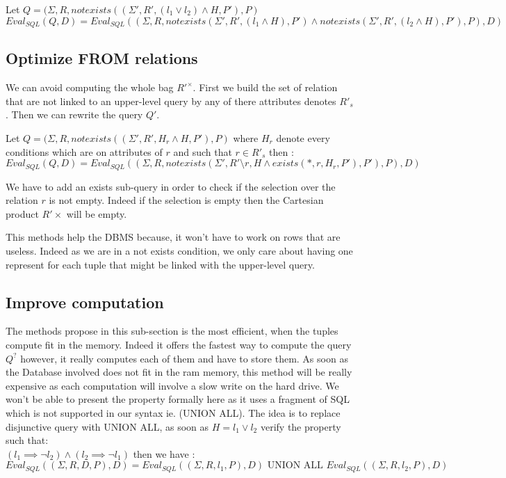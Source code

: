 \begin{myprop}
	Let $Q = (\Sigma,R,notexists((\Sigma',R',(l_1\lor l_2) \land H,P'),P)$
	$$Eval_{SQL}(Q,D) = Eval_{SQL}((\Sigma,R,notexists(\Sigma',R',(l_1 \land H),P') \land notexists(\Sigma',R',(l_2 \land H),P'),P),D)$$
\end{myprop}

\subsection{Optimize FROM relations}

We can avoid computing the whole bag $R'^\times$. 
First we build the set of relation that are not linked to an upper-level query by any of there attributes denotes $R'_s$. Then we can rewrite the query $Q'$.

\begin{myprop}
	Let $Q = (\Sigma,R,notexists((\Sigma',R',H_r \land H,P'),P)$ where $H_r$ denote every conditions which are on attributes of $r$ and such that $r \in R'_s$ then :
	$$Eval_{SQL}(Q,D) = Eval_{SQL}((\Sigma,R,notexists(\Sigma',R'\setminus r,H \land exists(*,r,H_r,P'),P'),P),D) $$
\end{myprop}

We have to add an exists sub-query in order to check if the selection over the relation $r$ is not empty. Indeed if the selection is empty then the Cartesian product $R'\times$ will be empty.

This methods help the DBMS because, it won't have to work on rows that are useless. Indeed as we are in a not exists condition, we only care about having one represent for each tuple that might be linked with the upper-level query.

\subsection{Improve computation}
The methods propose in this sub-section is the most efficient, when the tuples compute fit in the memory. Indeed it offers the fastest way to compute the query $Q^?$ however, it really computes each of them and have to store them. As soon as the Database involved does not fit in the ram memory, this method will be really expensive as each computation will involve a slow write on the hard drive.
We won't be able to present the property formally here as it uses a fragment of SQL which is not supported in our syntax ie. (UNION ALL). The idea is to replace disjunctive query with UNION ALL, as soon as $H = l_1\lor l_2$ verify the property such that: 
\\  $(l_1 \implies \neg l_2) \land (l_2 \implies \neg l_1)$ then we have :
$$ Eval_{SQL}((\Sigma,R,D,P),D) = Eval_{SQL}((\Sigma,R,l_1,P),D)\mbox{ UNION ALL } Eval_{SQL}((\Sigma,R,l_2,P),D)$$

